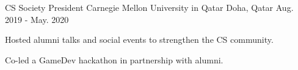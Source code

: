\begin{cventries}
\cventry
  {CS Society President} %
  {Carnegie Mellon University in Qatar} %
  {Doha, Qatar} %
  {Aug. 2019 - May. 2020} %
  {
    \begin{cvitems} %
      \item {Hosted alumni talks and social events to strengthen the CS community.}
      \item {Co-led a GameDev hackathon in partnership with alumni.}
    \end{cvitems}
  }
    
\end{cventries}
